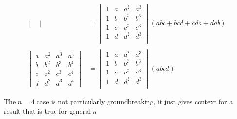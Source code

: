 \documentclass{article}
\begin{document}
\begin{align*}
\begin{vmatrix}
    \end{vmatrix} &= \begin{vmatrix}
        1 & a & a^2 & a^3\\
        1 & b & b^2 & b^3\\
        1 & c & c^2 & c^3\\
        1 & d & d^2 & d^3\\
    \end{vmatrix} \left(abc+bcd+cda+dab\right)\\\\
    \begin{vmatrix}
        a & a^2 & a^3 & a^4 \\
        b & b^2 & b^3 & b^4 \\
        c & c^2 & c^3 & c^4 \\
        d & d^2 & d^3 & d^4
    \end{vmatrix} &= \begin{vmatrix}
        1 & a & a^2 & a^3\\
        1 & b & b^2 & b^3\\
        1 & c & c^2 & c^3\\
        1 & d & d^2 & d^3\\
    \end{vmatrix} \left(abcd\right)
\end{align*}

The $n=4$ case is not particularly groundbreaking, it just gives context for a result that is true for general $n$
\end{document}
